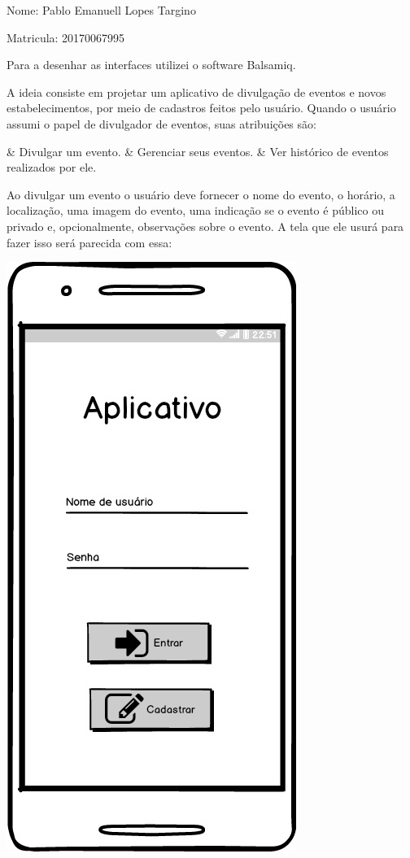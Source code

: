 \documentclass{article}
\begin{document}
\par Nome: Pablo Emanuell Lopes Targino
\par Matricula: 20170067995 \bigskip \bigskip

	Para a desenhar as interfaces utilizei o software Balsamiq.
	
	A ideia consiste em projetar um aplicativo de divulgação de eventos e novos estabelecimentos, por meio de cadastros feitos pelo usuário.
	Quando o usuário assumi o papel de divulgador de eventos, suas atribuições são:\medskip
	\begin{easylist}[itemize]
	& Divulgar um evento.
	& Gerenciar seus eventos.
	& Ver histórico de eventos realizados por ele.
	\end{easylist}\medskip
	Ao divulgar um evento o usuário deve fornecer o nome do evento, o horário, a localização, uma imagem do evento, uma indicação se o evento é público ou privado e, opcionalmente, observações sobre o evento. A tela que ele usurá para fazer isso será parecida com essa:
	\bigskip
	
	\begin{center}
	\includegraphics[scale=0.25]{ECV.png}
	\end{center}
	
\end{document}
